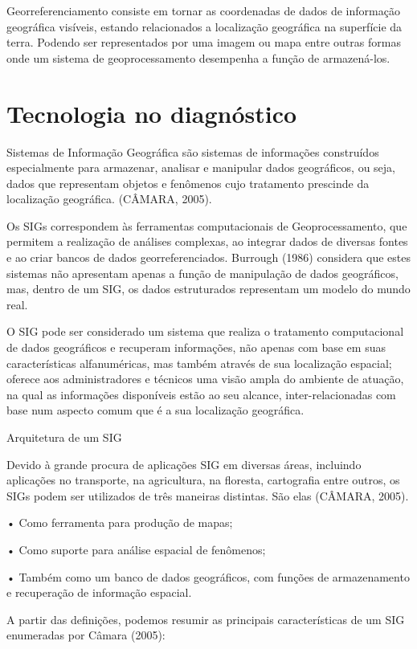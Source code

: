 \documentclass[
	12pt,				%
    oneside,			%
	a4paper,			%
	english,			%
	french,				%
	spanish,			%
	brazil,				%
	]{abntex2}
\begin{document}
Georreferenciamento consiste em tornar as coordenadas de dados de informação geográfica visíveis, estando relacionados a localização geográfica na superfície da terra. Podendo ser representados por uma imagem ou mapa entre outras formas onde um sistema de geoprocessamento desempenha a função de armazená-los.

\section{Tecnologia no diagnóstico}
Sistemas de Informação Geográfica são sistemas de informações construídos especialmente para armazenar, analisar e manipular dados geográficos, ou seja, dados que representam objetos e fenômenos cujo tratamento prescinde da localização geográfica. (CÂMARA, 2005). 

Os SIGs correspondem às ferramentas computacionais de Geoprocessamento, que permitem a realização de análises complexas, ao integrar dados de diversas fontes e ao criar bancos de dados georreferenciados. Burrough (1986) considera que estes sistemas não apresentam apenas a função de manipulação de dados geográficos, mas, dentro de um SIG, os dados estruturados representam um modelo do mundo real.

O SIG pode ser considerado um sistema que realiza o tratamento computacional de dados geográficos e recuperam informações, não apenas com base em suas características alfanuméricas, mas também através de sua localização espacial; oferece aos administradores e técnicos uma visão ampla do ambiente de atuação, na qual as informações disponíveis estão ao seu alcance, inter-relacionadas com base num aspecto comum que é a sua localização geográfica. 

Arquitetura de um SIG

Devido à grande procura de aplicações SIG em diversas áreas, incluindo aplicações no transporte, na agricultura, na floresta, cartografia entre outros, os SIGs podem ser utilizados de três maneiras distintas. São elas (CÂMARA, 2005).

•	Como ferramenta para produção de mapas;

•	Como suporte para análise espacial de fenômenos; 

•	Também como um banco de dados geográficos, com funções de armazenamento e recuperação de informação espacial.

A partir das definições, podemos resumir as principais características de um SIG enumeradas por Câmara (2005):
\end{document}
